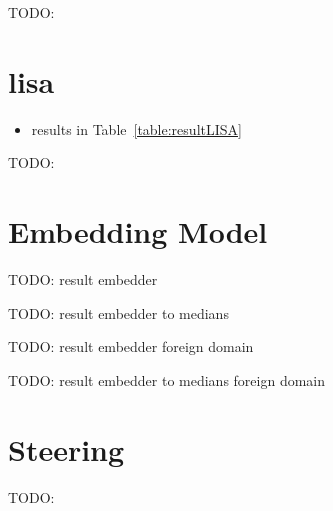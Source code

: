 \begin{table}[ht]
  \caption{TODO:}
  \resultSfam{}%
  \label{table:resultSFAM}
\end{table}


\section{\acs{lisa}}
\begin{itemize}
  \item results in Table~\ref{table:resultLISA}

\end{itemize}

\begin{table}[ht]
  \caption{TODO:}
  \resultLisa{}%
  \label{table:resultLISA}
\end{table}


\section{Embedding Model}

\begin{table}[ht]
  \caption{TODO: result embedder}
  \resultEmbedder{}%
  \label{table:resultEmbedder}
\end{table}

\begin{table}[ht]
  \caption{TODO: result embedder to medians}
  \resultEmbedderToMedians{}%
  \label{table:resultEmbedderToMedians}
\end{table}

\begin{table}[ht]
  \caption{TODO: result embedder foreign domain}
  \resultEmbedderForeignDomain{}%
  \label{table:resultEmbedderForeignDomain}
\end{table}

\begin{table}[ht]
  \caption{TODO: result embedder to medians foreign domain}
  \resultEmbedderToMediansForeignDomain{}%
  \label{table:resultEmbedderToMediansForeignDomain}
\end{table}

\section{Steering} %
\begin{table}[ht]
  \caption{TODO:}
  \centering
  \resultSteeringType{}%
  \label{table:resultSteeringType}
\end{table}

